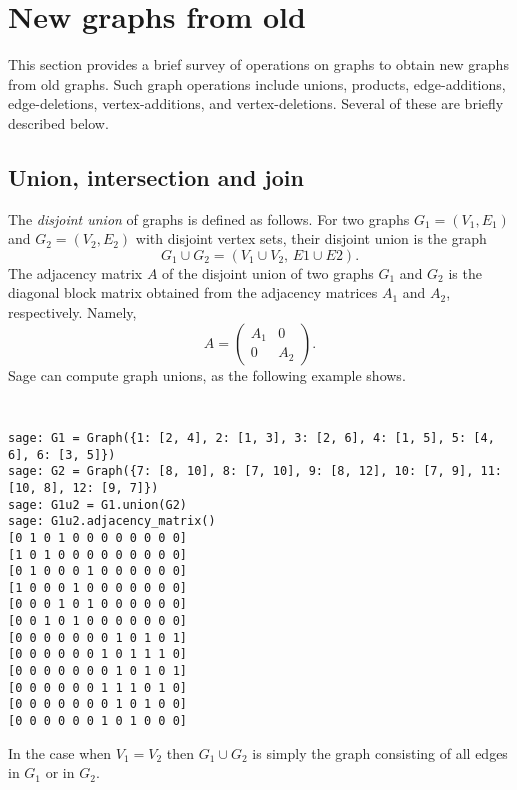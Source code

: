 
\section{New graphs from old}

This section provides a brief survey of operations on graphs to obtain
new graphs from old graphs. Such graph operations include unions,
products, edge-additions, edge-deletions, vertex-additions, and
vertex-deletions. Several of these are briefly described below.



\subsection{Union, intersection and join}

The \emph{disjoint union} of graphs is defined as follows. For two
graphs $G_1 = (V_1, E_1)$ and $G_2 = (V_2, E_2)$ with disjoint vertex
sets, their disjoint union is the graph
\[
G_1 \cup G_2
=
(V_1 \cup V_2,\, E1 \cup E2).
\]
The adjacency matrix $A$ of the disjoint union of two graphs $G_1$ and
$G_2$ is the diagonal block matrix obtained from the adjacency
matrices $A_1$ and $A_2$, respectively. Namely,
\[
A
=
\begin{pmatrix}
A_1 & 0 \\
0 & A_2
\end{pmatrix}.
\]
%
Sage can compute graph unions, as the following example shows.
%
\begin{center}
\fontsize{9pt}{9pt}
\selectfont
\tt
\begin{lstlisting}
sage: G1 = Graph({1: [2, 4], 2: [1, 3], 3: [2, 6], 4: [1, 5], 5: [4, 6], 6: [3, 5]})
sage: G2 = Graph({7: [8, 10], 8: [7, 10], 9: [8, 12], 10: [7, 9], 11: [10, 8], 12: [9, 7]})
sage: G1u2 = G1.union(G2)
sage: G1u2.adjacency_matrix()
[0 1 0 1 0 0 0 0 0 0 0 0]
[1 0 1 0 0 0 0 0 0 0 0 0]
[0 1 0 0 0 1 0 0 0 0 0 0]
[1 0 0 0 1 0 0 0 0 0 0 0]
[0 0 0 1 0 1 0 0 0 0 0 0]
[0 0 1 0 1 0 0 0 0 0 0 0]
[0 0 0 0 0 0 0 1 0 1 0 1]
[0 0 0 0 0 0 1 0 1 1 1 0]
[0 0 0 0 0 0 0 1 0 1 0 1]
[0 0 0 0 0 0 1 1 1 0 1 0]
[0 0 0 0 0 0 0 1 0 1 0 0]
[0 0 0 0 0 0 1 0 1 0 0 0]
\end{lstlisting}
\end{center}
In the case when $V_1=V_2$ then $G_1\cup G_2$ is simply
the graph consisting of all edges in $G_1$ or in $G_2$.


